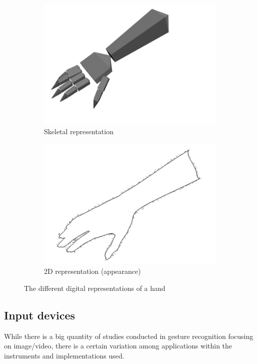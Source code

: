 \documentclass[12pt,a4paper,twoside]{report}
\begin{document}
\begin{figure}[h]
\begin{subfigure}{0.45\linewidth}
      \includegraphics[width=\linewidth]{img/Algorithms_hand_skeletal.png}
      \caption{Skeletal representation}  
    \end{subfigure}
    \begin{subfigure}{0.45\linewidth}
      \includegraphics[width=\linewidth]{img/Algorithms_hand_2d.png}
      \caption{2D representation (appearance)}  
    \end{subfigure}  
  \caption[]{The different digital representations of a hand \footnotemark}
  \label{mfig:hands}
\end{figure}

\subsection{Input devices}
While there is a big quantity of studies conducted in gesture recognition focusing on image/video, there is a certain variation among applications within the instruments and implementations used.
\end{document}
